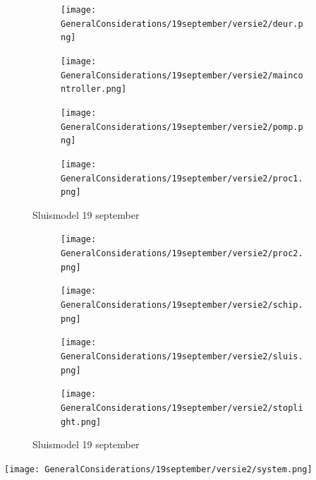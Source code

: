 \documentclass{article}
\begin{document}
	\begin{figure}
		\centering
		\begin{subfigure}{0.45\linewidth}
			\texttt{[image: GeneralConsiderations/19september/versie2/deur.png]}
			\caption{}
			\label{fig:1a}
		\end{subfigure}\hfill
		\begin{subfigure}{0.45\linewidth}
			\texttt{[image: GeneralConsiderations/19september/versie2/maincontroller.png]}
			\caption{}
			\label{fig:1a}
		\end{subfigure}
		
		\begin{subfigure}{0.45\linewidth}
			\texttt{[image: GeneralConsiderations/19september/versie2/pomp.png]}
			\caption{}
			\label{fig:1a}
		\end{subfigure}\hfill
		\begin{subfigure}{0.45\linewidth}
			\texttt{[image: GeneralConsiderations/19september/versie2/proc1.png]}
			\caption{}
			\label{fig:1a}
		\end{subfigure}
		\caption{Sluismodel 19 september}
		\label{fig:1}
	\end{figure}
	
	\begin{figure}
		\centering
		\begin{subfigure}{0.45\linewidth}
			\texttt{[image: GeneralConsiderations/19september/versie2/proc2.png]}
			\caption{}
			\label{fig:1a}
		\end{subfigure}\hfill
		\begin{subfigure}{0.45\linewidth}
			\texttt{[image: GeneralConsiderations/19september/versie2/schip.png]}
			\caption{}
			\label{fig:1a}
		\end{subfigure}
		
		\begin{subfigure}{0.45\linewidth}
			\texttt{[image: GeneralConsiderations/19september/versie2/sluis.png]}
			\caption{}
			\label{fig:1a}
		\end{subfigure}\hfill
		\begin{subfigure}{0.45\linewidth}
			\texttt{[image: GeneralConsiderations/19september/versie2/stoplight.png]}
			\caption{}
			\label{fig:1a}
		\end{subfigure}
		\caption{Sluismodel 19 september}
		\label{fig:1}
	\end{figure}
	
	
	\texttt{[image: GeneralConsiderations/19september/versie2/system.png]}
	\newpage
\end{document}
